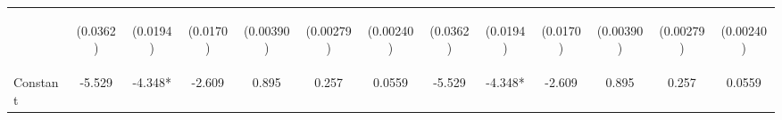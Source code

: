 \documentclass[]{article}
\begin{document}
\begin{center}
\begin{tabular}{lcccccccccccc}
\vspace{4pt} & \begin{footnotesize}(0.0362)\end{footnotesize} & \begin{footnotesize}(0.0194)\end{footnotesize} & \begin{footnotesize}(0.0170)\end{footnotesize} & \begin{footnotesize}(0.00390)\end{footnotesize} & \begin{footnotesize}(0.00279)\end{footnotesize} & \begin{footnotesize}(0.00240)\end{footnotesize} & \begin{footnotesize}(0.0362)\end{footnotesize} & \begin{footnotesize}(0.0194)\end{footnotesize} & \begin{footnotesize}(0.0170)\end{footnotesize} & \begin{footnotesize}(0.00390)\end{footnotesize} & \begin{footnotesize}(0.00279)\end{footnotesize} & \begin{footnotesize}(0.00240)\end{footnotesize} \\
Constant & -5.529 & -4.348* & -2.609 & 0.895 & 0.257 & 0.0559 & -5.529 & -4.348* & -2.609 & 0.895 & 0.257 & 0.0559 \\

\end{tabular}
\end{center}
\end{document}
